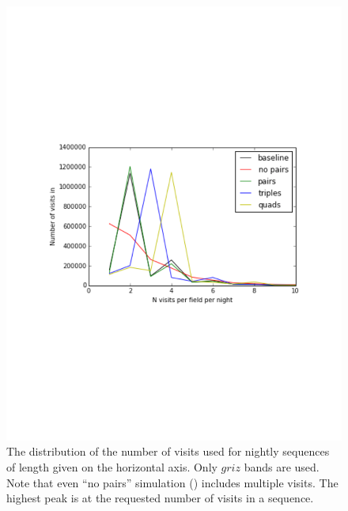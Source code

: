 \begin{figure}[t!]
\vskip -2.5in
\includegraphics[angle=0,width=0.99\hsize:,clip]{figs/NvisitStats.pdf}
\vskip -2.7in
\caption{The distribution of the number of visits used for nightly sequences of
length given on the horizontal axis. Only $griz$ bands are used. Note that even
``no pairs'' simulation ()
includes multiple visits. The highest peak is at the
requested number of visits in a sequence.}
\label{fig:NvisitStats}
\end{figure}

